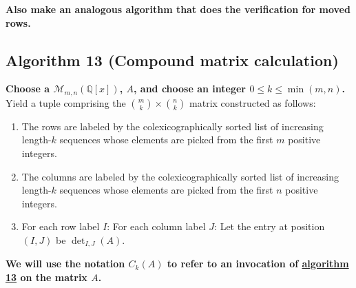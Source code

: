 \documentclass[twocolumn]{article}
\begin{document}
			\textbf{Also make an analogous algorithm that does the verification for moved rows.}
		\subsection{Algorithm 13 (Compound matrix calculation)}\label{sec:algorithm 13}
			\textbf{Choose a $\mathcal{M}_{m,n}(\mathbb{Q}[x])$, $A$, and choose an integer $0\le k\le\min(m,n)$.} Yield a tuple comprising the $\binom{m}{k}\times\binom{n}{k}$ matrix constructed as follows:
			\begin{enumerate}
				\item The rows are labeled by the colexicographically sorted list of increasing length-$k$ sequences whose elements are picked from the first $m$ positive integers.
				\item The columns are labeled by the colexicographically sorted list of increasing length-$k$ sequences whose elements are picked from the first $n$ positive integers.
				\item For each row label $I$: For each column label $J$: Let the entry at position $(I,J)$ be $\det_{I,J}(A)$.
			\end{enumerate}
			\textbf{We will use the notation $C_k(A)$ to refer to an invocation of \hyperref[sec:algorithm 13]{algorithm 13} on the matrix $A$.}
\end{document}

